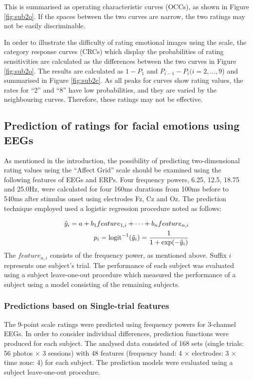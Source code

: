 \documentclass[fonts]{icst}
\begin{document}
This is summarised as operating characteristic curves (OCCs), as shown in
Figure \ref{fig:sub2o}. If the spaces between the two curves are narrow,
the two ratings may not be easily discriminable.

In order to illustrate the difficulty of rating emotional images using
the scale, the category response curves (CRCs) which display the
probabilities of rating sensitivities are calculated as the differences
between the two curves in Figure \ref{fig:sub2o}. 
The results are calculated as $1-P_1$ and $P_{i-1}-P_i (i=2,\dots,9$)
and summarised in Figure \ref{fig:sub2c}.  
As all peaks for curves show rating values, the rates for ``2'' and
``8'' have low probabilities, and they are varied by the neighbouring
curves.  Therefore, these ratings may not be effective.


\subsection{Prediction of ratings for facial emotions using EEGs}

As mentioned in the introduction, 
the possibility of predicting two-dimensional rating values using the
``Affect Grid'' scale should be examined using the following features of
EEGs and ERPs.
Four frequency powers, 6.25, 12.5, 18.75 and 25.0Hz, were calculated for
four 160ms durations from 100ms before to 540ms after stimulus onset using
electrodes Fz, Cz and Oz. 
The prediction technique employed used a logistic regression procedure 
noted as follows:

\begin{eqnarray}
\hat{y}_i = a + b_1 feature_{1,i} + \dots + b_n feature_{n,i} \notag \\
p_i = {\rm logit}^{-1} (\hat{y}_i) = \frac{1}{1+ \exp(-\hat{y}_i)} \notag
\end{eqnarray}
The $feature_{n,i}$ consists of the frequency power, as mentioned above.
Suffix $i$ represents one subject's trial.
The performance of each subject was evaluated using a subject
leave-one-out procedure which measured the performance of a subject
using a model consisting of the remaining subjects. 

\subsubsection{Predictions based on Single-trial features}

The 9-point scale ratings were predicted using frequency powers for
3-channel EEGs. In order to consider individual differences, prediction
functions were produced for each subject. 
The analysed data consisted of 168 sets (single trials: 56 photos
$\times$ 3 sessions) with 48 features
(frequency band: 4 $\times$ electrodes: 3 $\times$ time zone: 4) for each
subject. The prediction models were evaluated using a subject
leave-one-out procedure.
\end{document}
